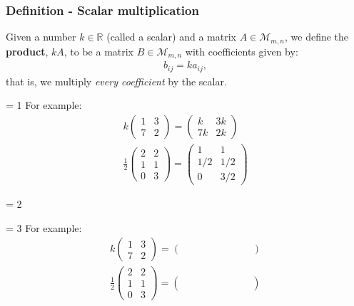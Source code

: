 \documentclass[usenames,dvipsnames,aspectratio=169,10pt]{beamer}
\def \EXAMPLEVERSION {3} %
\numberwithin{equation}{section}
\begin{document}
\begin{frame}
\frametitle{Definition - Scalar multiplication}
Given a number $k\in\mathbb{R}$ (called a scalar) and a matrix $A \in \mathcal{M}_{m,n}$, we define the \textbf{product}, $kA$, to be a matrix $B \in \mathcal{M}_{m,n}$ with coefficients given by:
\begin{align*}
b_{ij} = ka_{ij},
\end{align*}
that is, we multiply \textit{every coefficient} by the scalar. 

\ifnum \EXAMPLEVERSION = 1 {
For example:
\begin{gather*}
k
\begin{pmatrix}
 1 & 3 \\
 7 & 2 
\end{pmatrix}
=
\begin{pmatrix}
 k & 3k \\
 7k & 2k 
\end{pmatrix}
\\
\frac{1}{2}
\begin{pmatrix}
 2 & 2 \\
 1 & 1 \\
 0 & 3 
\end{pmatrix}
=
\begin{pmatrix}
 1 & 1 \\
 1/2 & 1/2 \\
 0 & 3/2 
\end{pmatrix}
\end{gather*}
}
\fi

\ifnum \EXAMPLEVERSION = 2
\fi 

\ifnum \EXAMPLEVERSION = 3 {
For example:
\begin{gather*}
k
\begin{pmatrix}
 1 & 3 \\
 7 & 2 
\end{pmatrix}
=
\begin{pmatrix}
 \quad & \quad & \quad & \quad \\
 \quad & \quad & \quad & \quad
\end{pmatrix}
\\
\frac{1}{2}
\begin{pmatrix}
 2 & 2 \\
 1 & 1 \\
 0 & 3 
\end{pmatrix}
=
\begin{pmatrix}
 \quad & \quad & \quad & \quad \\
 \quad & \quad & \quad & \quad \\
 \quad & \quad & \quad & \quad
\end{pmatrix}
\end{gather*}
}
\fi 



\end{frame}
\end{document}
